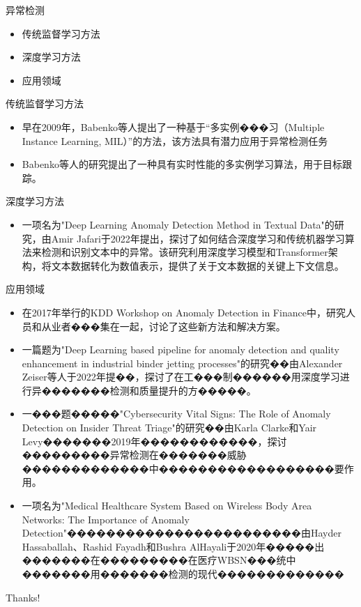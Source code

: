 \documentclass[UTF8,AutoFakeBold,AutoFakeSlant]{beamer}
\begin{document}
\begin{frame}{异常检测}
    \begin{itemize}
        \item 传统监督学习方法
        \item 深度学习方法
        \item 应用领域
    \end{itemize}
\end{frame}

\begin{frame}{传统监督学习方法}
    \begin{itemize}
        \item 早在2009年，Babenko等人提出了一种基于“多实例���习（Multiple Instance Learning, MIL）”的方法，该方法具有潜力应用于异常检测任务
        \item Babenko等人的研究提出了一种具有实时性能的多实例学习算法，用于目标跟踪。
    \end{itemize}
\end{frame}

\begin{frame}{深度学习方法}
    \begin{itemize}
        \item 一项名为"Deep Learning Anomaly Detection Method in Textual Data"的研究，由Amir Jafari于2022年提出，探讨了如何结合深度学习和传统机器学习算法来检测和识别文本中的异常。该研究利用深度学习模型和Transformer架构，将文本数据转化为数值表示，提供了关于文本数据的关键上下文信息。
    \end{itemize}
\end{frame}

\begin{frame}{应用领域}
    \scriptsize
    \begin{itemize}
        \item 在2017年举行的KDD Workshop on Anomaly Detection in Finance中，研究人员和从业者���集在一起，讨论了这些新方法和解决方案。
        \item 一篇题为"Deep Learning based pipeline for anomaly detection and quality enhancement in industrial binder jetting processes"的研究��由Alexander Zeiser等人于2022年提��，探讨了在工���制������用深度学习进行异�������检测和质量提升的方�����。
        \item 一���题�����"Cybersecurity Vital Signs: The Role of Anomaly Detection on Insider Threat Triage"的研究��由Karla Clarke和Yair Levy�������2019年������������，探讨���������异常检测在�������威胁�������������中������������������要作用。
        \item 一项名为"Medical Healthcare System Based on Wireless Body Area Networks: The Importance of Anomaly Detection"������������������������由Hayder Hassaballah、Rashid Fayadh和Bushra AlHayali于2020年�����出�������在���������在医疗WBSN���统中�������用�������检测的现代�������������
    \end{itemize}
\end{frame}

\begin{frame}
    \begin{center}
        {\Huge\calligra Thanks!}
    \end{center}
\end{frame}
\end{document}
